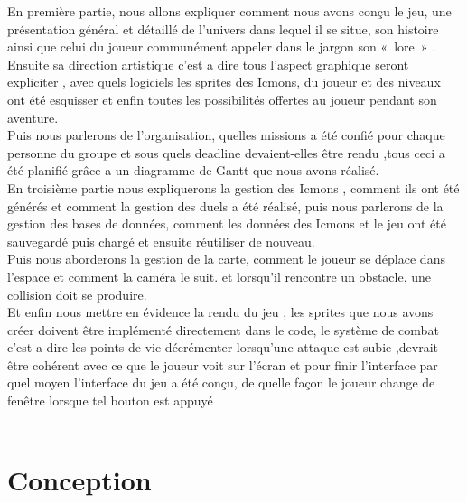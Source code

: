 \documentclass[12pt,a4paper, twoside]{article}
\begin{document}
En première partie, nous allons expliquer comment nous avons conçu le jeu, une présentation général et détaillé de l’univers dans lequel il se situe, son histoire ainsi que celui du joueur communément appeler dans le jargon son « lore » .
Ensuite sa direction artistique c’est a dire tous l’aspect graphique seront expliciter , avec quels logiciels les sprites des Icmons, du joueur et des niveaux ont été esquisser et enfin toutes les possibilités offertes au joueur pendant son aventure.\\

Puis nous parlerons de l’organisation, quelles missions a été confié pour chaque personne du groupe et sous quels deadline devaient-elles être rendu ,tous ceci a été planifié grâce a un diagramme de Gantt que nous avons réalisé.\\

En troisième partie nous expliquerons la gestion des Icmons , comment ils ont été générés et comment la gestion des duels a été réalisé, puis nous parlerons de la gestion des bases de données, comment les données des Icmons et le jeu ont été sauvegardé puis chargé et ensuite réutiliser de nouveau.\\

Puis nous aborderons la gestion de la carte, comment le joueur se déplace dans l'espace et comment la caméra le suit. et lorsqu'il rencontre un obstacle, une collision doit se produire.\\

Et enfin nous mettre en évidence la rendu du jeu , les sprites que nous avons créer doivent être implémenté directement dans le code, le système de combat c’est a dire les points de vie décrémenter lorsqu’une attaque est subie ,devrait être cohérent avec ce que le joueur voit sur l’écran et pour finir l’interface par quel moyen l’interface du jeu a été conçu, de quelle façon le joueur change de fenêtre lorsque tel bouton est appuyé\\\\
\lfoot{}
\newpage
\section{Conception}
\end{document}
